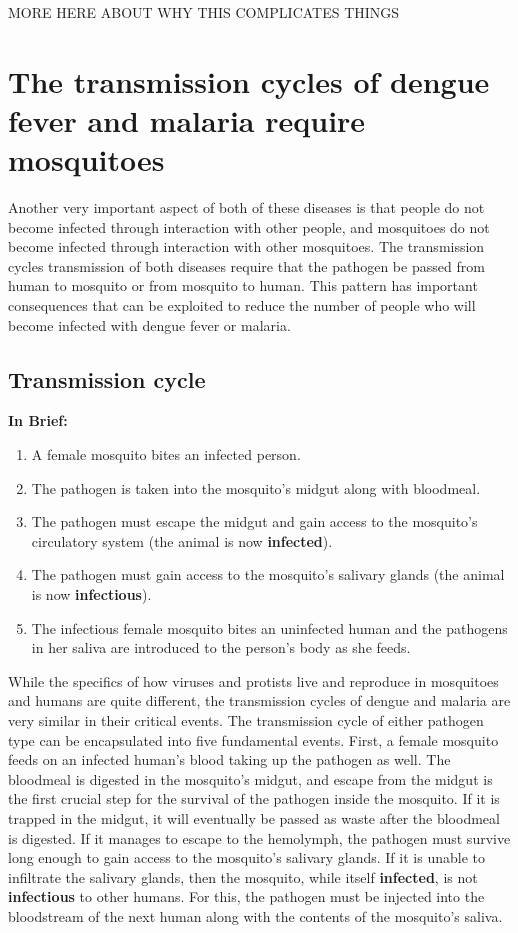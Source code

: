 \alert{MORE HERE ABOUT WHY THIS COMPLICATES THINGS}

\section{The transmission cycles of dengue fever and malaria require mosquitoes}

Another very important aspect of both of these diseases is that people do not become infected through interaction with other people, and mosquitoes do not become infected through interaction with other mosquitoes.
The transmission cycles transmission of both diseases require that the pathogen be passed from human to mosquito or from mosquito to human.
This pattern has important consequences that can be exploited to reduce the number of people who will become infected with dengue fever or malaria.

\subsection{Transmission cycle}

\textbf{In Brief:}
\begin{enumerate}
\item A female mosquito bites an infected person.
\item The pathogen is taken into the mosquito's midgut along with bloodmeal.
\item The pathogen must escape the midgut and gain access to the mosquito's circulatory system (the animal is now \textbf{infected}).
\item The pathogen must gain access to the mosquito's salivary glands (the animal is now \textbf{infectious}).
\item The infectious female mosquito bites an uninfected human and the pathogens in her saliva are introduced to the person's body as she feeds.
\end{enumerate}

While the specifics of how viruses and protists live and reproduce in mosquitoes and humans are quite different, the transmission cycles of dengue and malaria are very similar in their critical events.
The transmission cycle of either pathogen type can be encapsulated into five fundamental events.
First, a female mosquito feeds on an infected human's blood taking up the pathogen as well.
The bloodmeal is digested in the mosquito's midgut, and escape from the midgut is the first crucial step for the survival of the pathogen inside the mosquito.
If it is trapped in the midgut, it will eventually be passed as waste after the bloodmeal is digested.
If it manages to escape to the \gls{hemolymph}, the pathogen must survive long enough to gain access to the mosquito's salivary glands.
If it is unable to infiltrate the salivary glands, then the mosquito, while itself \textbf{infected}, is not \textbf{infectious} to other humans.
For this, the pathogen must be injected into the bloodstream of the next human along with the contents of the mosquito's saliva.

